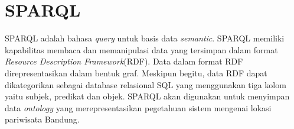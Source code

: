 \section{SPARQL}
SPARQL adalah bahasa \textit{query} untuk basis data \textit{semantic}. SPARQL memiliki kapabilitas membaca dan memanipulasi data yang tersimpan dalam format \textit{Resource Description Framework}(RDF). Data dalam format RDF direpresentasikan dalam bentuk graf. Meskipun begitu, data RDF dapat dikategorikan sebagai database relasional SQL yang menggunakan tiga kolom yaitu subjek, predikat dan objek.
SPARQL akan digunakan untuk menyimpan data \textit{ontology} yang merepresentasikan pegetahuan sistem mengenai lokasi pariwisata Bandung. 
 